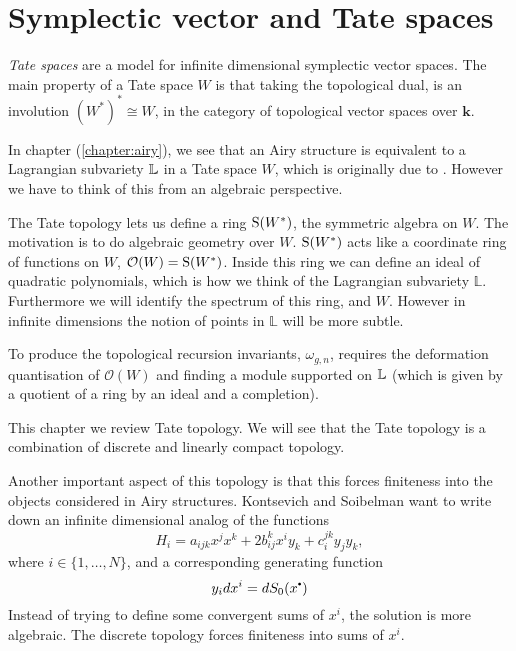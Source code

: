 \chapter{Symplectic vector and Tate spaces}
    \label{chapter:tate}
    
    \emph{Tate spaces} \cite{lefschetz1942algebraic, drinfeld_tate} are a model for infinite dimensional symplectic vector spaces. The main property of a Tate space \(W\) is that taking the topological dual, is an involution \( (W^*)^* \cong W\), in the category of topological vector spaces over \( \mathbf{k}\). 
    
    In chapter (\ref{chapter:airy}), we see that an Airy structure is equivalent to a Lagrangian subvariety \( \mathbb{L}\) in a Tate space \(W\), which is originally due to \cite{ks_airy}. However we have to think of this from an algebraic perspective.
    
    The Tate topology lets us define a ring \( \mathrm{S}(W^{*})\), the symmetric algebra on \(W\). The motivation is to do algebraic geometry over \(W\). \( \mathrm{S}(W^{*})\) acts like a coordinate ring of functions on \(W\), \( \mathcal{O}(W) = \mathrm{S}(W^{*})\). Inside this ring we can define an ideal of quadratic polynomials, which is how we think of the Lagrangian subvariety \( \mathbb{L}\). Furthermore we will identify the spectrum of this ring, and \(W\). However in infinite dimensions the notion of points in \( \mathbb{L}\) will be more subtle.
   
    To produce the topological recursion invariants, \( \omega_{g,n}\), requires the deformation quantisation of \( \mathcal{O}(W)\) and finding a module supported on \(\mathbb{L}\) (which is given by a quotient of a ring by an ideal and a completion). 
    
    
    This chapter we review Tate topology. We will see that the Tate topology is a combination of discrete and linearly compact topology.
    
    Another important aspect of this topology is that this forces finiteness into the objects considered in Airy structures. Kontsevich and Soibelman want to write down an infinite dimensional analog of the functions 
    \[ H_i = a_{ijk} x^j x^k + 2 b_{ij}^k x^i y_k + c_{i}^{jk} y_j y_k, \]
    where \(i \in \{ 1, \dots, N\}\), and a corresponding generating function 
    \[ y_{i} dx^i = d S_0(x^{\sbt})\]
    Instead of trying to define some convergent sums of \(x^i\), the solution is more algebraic. The discrete topology forces finiteness into sums of \(x^i\). 
    
